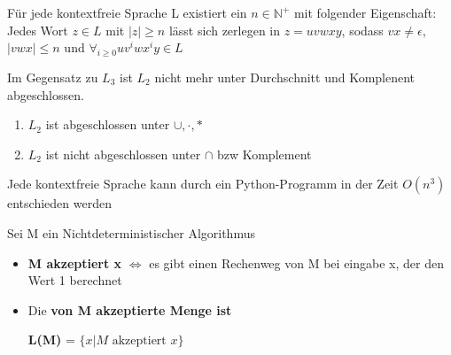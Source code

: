 \documentclass[14pt]{article}
\begin{document}
\begin{definition}
    Für jede kontextfreie Sprache L existiert ein $n \in \mathbb{N}^+$ mit folgender
    Eigenschaft: \\
    Jedes Wort $z \in L$ mit $|z| \geq n$ lässt sich zerlegen in $z = uvwxy$, sodass
    $vx \neq \epsilon$, $|vwx| \leq n$ und $\forall_{i \geq 0} uv^iwx^iy \in L$
\end{definition}
\begin{eigenschaft}
    Im Gegensatz zu $L_3$ ist $L_2$ nicht mehr unter Durchschnitt und Komplenent
    abgeschlossen.
    \begin{enumerate}
        \item $L_2$ ist abgeschlossen unter $\cup, \cdot, *$
        \item $L_2$ ist nicht abgeschlossen unter $\cap$ bzw Komplement
    \end{enumerate}
\end{eigenschaft}
\begin{eigenschaft}
    Jede kontextfreie Sprache kann durch ein Python-Programm in der
    Zeit $O(n^3)$ entschieden werden
\end{eigenschaft}
\begin{definition}
    Sei M ein Nichtdeterministischer Algorithmus
    \begin{itemize}
        \item \textbf{M akzeptiert x} $\Leftrightarrow$ es gibt einen Rechenweg von M
        bei eingabe x, der den Wert 1 berechnet
        \item Die \textbf{von M akzeptierte Menge ist} 
        \begin{center}
            \textbf{L(M)} = $\{ x | M \text{ akzeptiert } x\}$
        \end{center}
    \end{itemize}
\end{definition}
\end{document}
